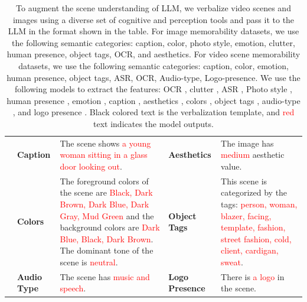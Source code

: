 \begin{landscape}
\begin{table}[h]
\begin{center}
{\begin{tabular}{cp{1.8cm}p{5.5cm}p{1.5cm}p{5.5cm}}
    & \textbf{Caption} & The scene shows \textcolor{red}{a young woman sitting in a glass door looking out}.    & \textbf{Aesthetics} & The image has \textcolor{red}{medium} aesthetic value.\\
    & \textbf{Colors} & The foreground colors of the scene are \textcolor{red}{Black, Dark Brown, Dark Blue, Dark Gray, Mud Green} and the background colors are \textcolor{red}{Dark Blue, Black, Dark Brown}. The dominant tone of the scene is \textcolor{red}{neutral}.
    & \textbf{Object Tags} & This scene is categorized by the tags: \textcolor{red}{person, woman,  blazer, facing, template, fashion, street fashion, cold, client, cardigan, sweat}.\\
    & \textbf{Audio Type} & The scene has \textcolor{red}{music and speech}. & \textbf{Logo Presence} & There is \textcolor{red}{a logo} in the scene.\\\hline
  \end{tabular}}
  \caption{To augment the scene understanding of LLM, we verbalize video scenes and images using a diverse set of cognitive and perception tools and pass it to the LLM in the format shown in the table. For image memorability datasets, we use the following semantic categories: caption, color, photo style, emotion, clutter, human presence, object tags, OCR, and aesthetics. For video scene memorability datasets, we use the following semantic categories: caption, color, emotion, human presence, object tags, ASR, OCR, Audio-type, Logo-presence. We use the following models to extract the features: OCR \protect\cite{du2020pp}, clutter \protect\cite{khurana-etal-2023-synthesizing}, ASR \protect\cite{radford2022robust}, Photo style \protect\cite{li2023blip}, human presence \protect\cite{liu2023grounding}, emotion \protect\cite{singh2024llava}, caption \protect\cite{li2023blip}, aesthetics \protect\cite{ke2023vila}, colors \protect\cite{Qin_2020_PR}, object tags \protect\cite{zhang2023recognize}, audio-type \protect\cite{giannakopoulos2015pyaudioanalysis}, and logo presence \protect\cite{zhang2023recognize}. Black colored text is the verbalization template, and \textcolor{red}{red} text indicates the model outputs.
  \label{table:scene-verbalization-format}}
\end{center}
\end{table}


\end{landscape}




